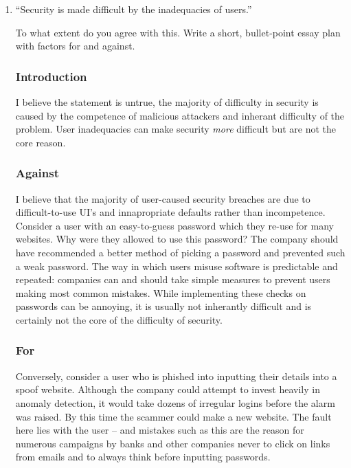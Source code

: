 \documentclass[10pt,\jkfside,a4paper]{article}
\begin{document}
\begin{enumerate}
\begin{enumerate}
\begin{itemize}
\end{itemize}

\end{enumerate}

\item ``Security is made difficult by the inadequacies of users.''

To what extent do you agree with this. Write a short, bullet-point essay plan with factors for and against.

\subsubsection*{Introduction}

I believe the statement is untrue, the majority of difficulty in security is caused by the 
competence of malicious attackers and inherant difficulty of the problem. User inadequacies can 
make security \textit{more} difficult but are not the core reason.

\subsubsection*{Against}

I believe that the majority of user-caused security breaches are due to difficult-to-use UI's and 
innapropriate defaults rather than incompetence. Consider a user with an easy-to-guess password which 
they re-use for many websites. Why were they allowed to use this password? The company should have 
recommended a better method of picking a password and prevented such a weak password. The way in which 
users misuse software is predictable and repeated: companies can and should take simple measures to 
prevent users making most common mistakes. While implementing these checks on passwords can be 
annoying, it is usually not inherantly difficult and is certainly not the core of the difficulty 
of security.

\subsubsection*{For}

Conversely, consider a user who is phished into inputting their details into a spoof website. 
Although the company could attempt to invest heavily in anomaly detection, it would take dozens 
of irregular logins before the alarm was raised. By this time the scammer could make a new website. 
The fault here lies with the user -- and mistakes such as this are the reason for numerous 
campaigns by banks and other companies never to click on links from emails and to always think 
before inputting passwords.


\end{enumerate}
\end{document}
